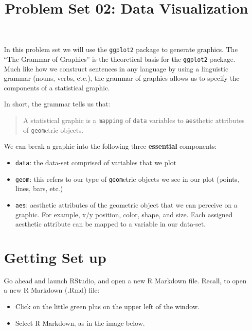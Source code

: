 \documentclass[]{article}
\title{Problem Set 02: Data Visualization}
\author{}
\date{\vspace{-2.5em}}
\providecommand{\tightlist}{%
  \setlength{\itemsep}{0pt}\setlength{\parskip}{0pt}}
\begin{document}
\maketitle

{
\setcounter{tocdepth}{2}
\tableofcontents
}
In this problem set we will use the \texttt{ggplot2} package to generate
graphics. The ``The Grammar of Graphics'' is the theoretical basis for
the \texttt{ggplot2} package. Much like how we construct sentences in
any language by using a linguistic grammar (nouns, verbs, etc.), the
grammar of graphics allows us to specify the components of a statistical
graphic.

In short, the grammar tells us that:

\begin{quote}
A statistical graphic is a \texttt{mapping} of \texttt{data} variables
to \texttt{aes}thetic attributes of \texttt{geom}etric objects.
\end{quote}

We can break a graphic into the following three \textbf{essential}
components:

\begin{itemize}
\tightlist
\item
  \texttt{data}: the data-set comprised of variables that we plot
\item
  \texttt{geom}: this refers to our type of \texttt{geom}etric objects
  we see in our plot (points, lines, bars, etc.)
\item
  \texttt{aes}: aesthetic attributes of the geometric object that we can
  perceive on a graphic. For example, x/y position, color, shape, and
  size. Each assigned aesthetic attribute can be mapped to a variable in
  our data-set.
\end{itemize}

\hypertarget{getting-set-up}{%
\section{Getting Set up}\label{getting-set-up}}

Go ahead and launch RStudio, and open a new R Markdown file. Recall, to
open a new R Markdown (.Rmd) file:

\begin{itemize}
\tightlist
\item
  Click on the little green plus on the upper left of the window.
\item
  Select R Markdown, as in the image below.
\end{itemize}
\end{document}
